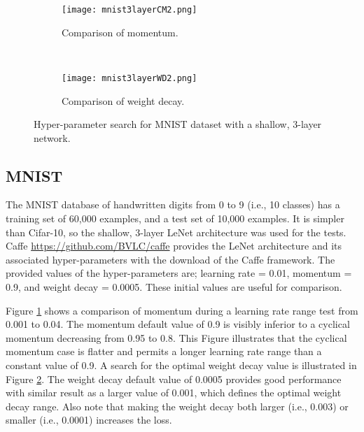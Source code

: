 \documentclass{article} %
\begin{document}
\begin{figure}[tbh]
	\centering
	\begin{subfigure}[b]{0.47\textwidth}
		\texttt{[image: mnist3layerCM2.png]}
		\caption{Comparison of momentum.}
		\label{fig:mnist3layerCM2}       %
	\end{subfigure}
	\quad
	\hfill
	~ %
	\centering
	\begin{subfigure}[b]{0.46\textwidth}
		\texttt{[image: mnist3layerWD2.png]}
		\caption{Comparison of weight decay.}
		\label{fig:mnist3layerWD2}       %
	\end{subfigure}
	\caption{Hyper-parameter search for MNIST dataset with a shallow, 3-layer network.}
	\label{fig:mnist3layer}
	\vspace{-15pt}	
\end{figure}


\subsection{MNIST}

The MNIST database of handwritten digits from 0 to 9 (i.e., 10 classes)  has a training set of 60,000 examples, and a test set of 10,000 examples.  It is simpler than Cifar-10, so the shallow, 3-layer LeNet architecture was used for the tests.  Caffe \url{https://github.com/BVLC/caffe} provides the LeNet architecture and its associated hyper-parameters with the download of the Caffe framework.  The provided values of the hyper-parameters are; learning rate = 0.01, momentum = 0.9, and weight decay = 0.0005.  These initial values are useful for comparison.

Figure \ref{fig:mnist3layerCM2} shows a comparison of momentum during a learning rate range test from 0.001 to 0.04. The momentum default value of 0.9 is visibly inferior to a cyclical momentum decreasing from 0.95 to 0.8.  This Figure illustrates that the cyclical momentum case is flatter and permits a longer learning rate range than a constant value of 0.9.  A search for the optimal weight decay value is illustrated in Figure \ref{fig:mnist3layerWD2}.  The weight decay default value of 0.0005 provides good performance with similar result as a larger value of 0.001, which defines the optimal weight decay range.  Also note that making the weight decay both larger (i.e., 0.003) or smaller (i.e., 0.0001) increases the loss.
\end{document}
